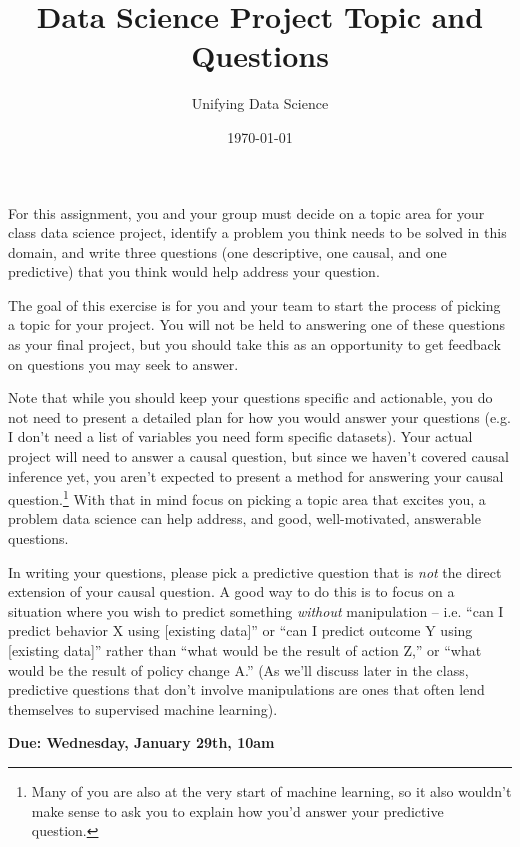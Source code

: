 \documentclass[12pt]{article}
\title{Data Science Project Topic and Questions}
\author{Unifying Data Science}
\date{\today}
\begin{document}
\maketitle

For this assignment, you and your group must decide on a topic area for your class data science project, identify a problem you think needs to be solved in this domain, and write three questions (one descriptive, one causal, and one predictive) that you think would help address your question.

The goal of this exercise is for you and your team to start the process of picking a topic for your project. You will not be held to answering one of these questions as your final project, but you should take this as an opportunity to get feedback on questions you may seek to answer.

Note that while you should keep your questions specific and actionable, you do not need to present a detailed plan for how you would answer your questions (e.g. I don't need a list of variables you need form specific datasets). Your actual project will need to answer a causal question, but since we haven't covered causal inference yet, you aren't expected to present a method for answering your causal question.\footnote{Many of you are also at the very start of machine learning, so it also wouldn't make sense to ask you to explain how you'd answer your predictive question.} With that in mind focus on picking a topic area that excites you, a problem data science can help address, and good, well-motivated, answerable questions.

In writing your questions, please pick a predictive question that is \emph{not} the direct extension of your causal question. A good way to do this is to focus on a situation where you wish to predict something \emph{without} manipulation -- i.e. ``can I predict behavior X using [existing data]'' or ``can I predict outcome Y using [existing data]'' rather than ``what would be the result of action Z,'' or ``what would be the result of policy change A.'' (As we'll discuss later in the class, predictive questions that don't involve manipulations are ones that often lend themselves to supervised machine learning).

\textbf{Due: Wednesday, January 29th, 10am}
\end{document}
